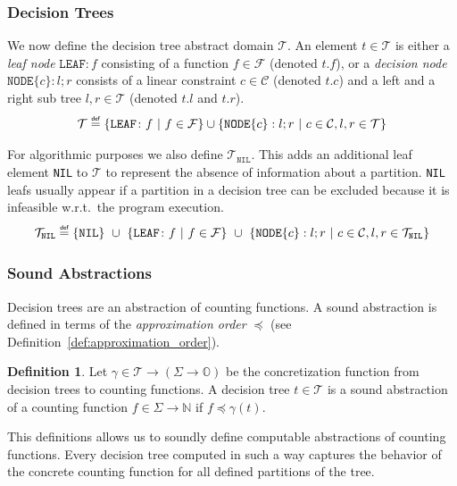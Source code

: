 \documentclass[11pt,a4paper,titlepage]{article}
\theoremstyle{definition}
\newtheorem{definition}{Definition}[section]
\newcommand\eqdef{\mathrel{\overset{\makebox[0pt]{\mbox{\normalfont\tiny\sffamily def}}}{=}}}
\begin{document}
\subsubsection*{Decision Trees}

We now define the decision tree abstract domain $\mathcal{T}$.
An element $t \in \mathcal{T}$ is either a \textit{leaf node} $\mathtt{LEAF} \colon f$ consisting of a function $f \in \mathcal{F}$ (denoted $t.f$),
or a \textit{decision node} $\mathtt{NODE}\{c\}: l; r$ consists of a linear constraint $c \in \mathcal{C}$ (denoted $t.c$) 
and a left and a right sub tree $l, r \in \mathcal{T}$ 
(denoted $t.l$ and $t.r$).
\[
    \mathcal{T} \eqdef \{\mathtt{LEAF} \colon f \ | \ f \in \mathcal{F}\} \cup \{\mathtt{NODE}\{c\}: l; r \ | \ c \in \mathcal{C}, l, r \in \mathcal{T} \} 
\]

For algorithmic purposes we also define $\mathcal{T}_{\mathtt{NIL}}$. 
This adds an additional leaf element \texttt{NIL} to $\mathcal{T}$ to represent the absence of information about a partition.
\texttt{NIL} leafs usually appear if a partition in a decision tree can be excluded because it is infeasible w.r.t.\ the program execution.
\[
    \mathcal{T}_{\mathtt{NIL}} \eqdef \{\mathtt{NIL}\} \ \cup \ \{\mathtt{LEAF} \colon f \ | 
    \ f \in \mathcal{F}\} \ \cup \ \{\mathtt{NODE}\{c\}: l; r \ | \ c \in \mathcal{C}, l, r \in \mathcal{T}_{\mathtt{NIL}}  \} 
\]


\subsubsection*{Sound Abstractions}

Decision trees are an abstraction of counting functions.  
A sound abstraction is defined in terms of the \textit{approximation order} $\preceq$ (see Definition~\ref{def:approximation_order}).\\

\begin{definition}\label{def:sound_abstraction}
    Let $\gamma \in \mathcal{T} \rightarrow (\Sigma \rightarrow \mathbb{O}) $ be the concretization function from decision trees to counting functions.
    A decision tree $t \in \mathcal{T}$ is a sound abstraction of a counting function $f \in \Sigma \rightarrow \mathbb{N}$ if $f \preceq \gamma(t)$.\\
\end{definition}

This definitions allows us to soundly define computable abstractions of counting functions. 
Every decision tree computed in such a way captures the behavior of the concrete counting function for 
all defined partitions of the tree.
\end{document}
